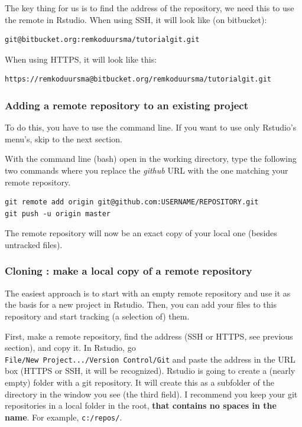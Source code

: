 \documentclass[]{book}
\begin{document}
The key thing for us is to find the address of the repository, we need this to use the remote in Rstudio. When using SSH, it will look like (on bitbucket):

\begin{verbatim}
git@bitbucket.org:remkoduursma/tutorialgit.git
\end{verbatim}

When using HTTPS, it will look like this:

\begin{verbatim}
https://remkoduursma@bitbucket.org/remkoduursma/tutorialgit.git
\end{verbatim}

\hypertarget{adding-a-remote-repository-to-an-existing-project}{%
\subsubsection{Adding a remote repository to an existing project}\label{adding-a-remote-repository-to-an-existing-project}}

To do this, you have to use the command line. If you want to use only Rstudio's menu's, skip to the next section.

With the command line (bash) open in the working directory, type the following two commands where you replace the \emph{github} URL with the one matching your remote repository.

\begin{verbatim}
git remote add origin git@github.com:USERNAME/REPOSITORY.git
git push -u origin master
\end{verbatim}

The remote repository will now be an exact copy of your local one (besides untracked files).

\hypertarget{cloning-make-a-local-copy-of-a-remote-repository}{%
\subsubsection{Cloning : make a local copy of a remote repository}\label{cloning-make-a-local-copy-of-a-remote-repository}}

The easiest approach is to start with an empty remote repository and use it as the basis for a new project in Rstudio. Then, you can add your files to this repository and start tracking (a selection of) them.

First, make a remote repository, find the address (SSH or HTTPS, see previous section), and copy it. In Rstudio, go \texttt{File/New\ Project.../Version\ Control/Git} and paste the address in the URL box (HTTPS or SSH, it will be recognized). Rstudio is going to create a (nearly empty) folder with a git repository. It will create this as a subfolder of the directory in the window you see (the third field). I recommend you keep your git repositories in a local folder in the root, \textbf{that contains no spaces in the name}. For example, \texttt{c:/repos/}.
\end{document}
